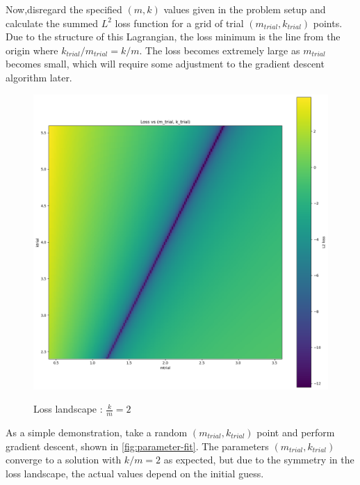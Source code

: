 \documentclass[]{article}
\begin{document}
Now,disregard the specified $(m,k)$ values given in the problem setup and calculate the summed $L^2$ loss function for a grid of trial $(m_{trial},k_{trial})$ points. Due to the structure of this Lagrangian, the loss minimum is the line from the origin where $k_{trial}/m_{trial} = k/m$. The loss becomes extremely large as $m_{trial}$ becomes small, which will require some adjustment to the gradient descent algorithm later.

\begin{figure}[H]
	\caption{Loss landscape : $\frac{k}{m}=2$}
	\centering
	\includegraphics[scale=0.26]{loss-landscape.png}
	\label{fig:loss-landscape}
\end{figure}

As a simple demonstration, take a random $(m_{trial},k_{trial})$ point and perform gradient descent, shown in \ref{fig:parameter-fit}. The parameters $(m_{trial},k_{trial})$  converge to a solution with $k/m=2$ as expected, but due to the symmetry in the loss landscape, the actual values depend on the initial guess.
\end{document}
